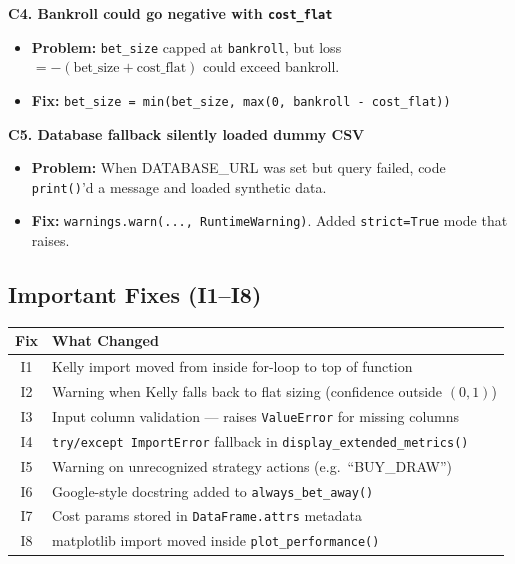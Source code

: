 \documentclass[11pt,a4paper]{article}
\begin{document}
\textbf{C4. Bankroll could go negative with \texttt{cost\_flat}}
\begin{itemize}[nosep]
    \item \textbf{Problem:} \texttt{bet\_size} capped at \texttt{bankroll}, but loss $= -(\text{bet\_size} + \text{cost\_flat})$ could exceed bankroll.
    \item \textbf{Fix:} \texttt{bet\_size = min(bet\_size, max(0, bankroll - cost\_flat))}
\end{itemize}

\textbf{C5. Database fallback silently loaded dummy CSV}
\begin{itemize}[nosep]
    \item \textbf{Problem:} When DATABASE\_URL was set but query failed, code \texttt{print()}'d a message and loaded synthetic data.
    \item \textbf{Fix:} \texttt{warnings.warn(..., RuntimeWarning)}. Added \texttt{strict=True} mode that raises.
\end{itemize}

\subsection{Important Fixes (I1--I8)}

\begin{table}[h]
\centering
\begin{tabular}{@{}cp{10cm}@{}}
\toprule
\textbf{Fix} & \textbf{What Changed} \\
\midrule
I1 & Kelly import moved from inside for-loop to top of function \\
I2 & Warning when Kelly falls back to flat sizing (confidence outside $(0,1)$) \\
I3 & Input column validation --- raises \texttt{ValueError} for missing columns \\
I4 & \texttt{try/except ImportError} fallback in \texttt{display\_extended\_metrics()} \\
I5 & Warning on unrecognized strategy actions (e.g.\ ``BUY\_DRAW'') \\
I6 & Google-style docstring added to \texttt{always\_bet\_away()} \\
I7 & Cost params stored in \texttt{DataFrame.attrs} metadata \\
I8 & matplotlib import moved inside \texttt{plot\_performance()} \\
\bottomrule
\end{tabular}
\end{table}
\end{document}
